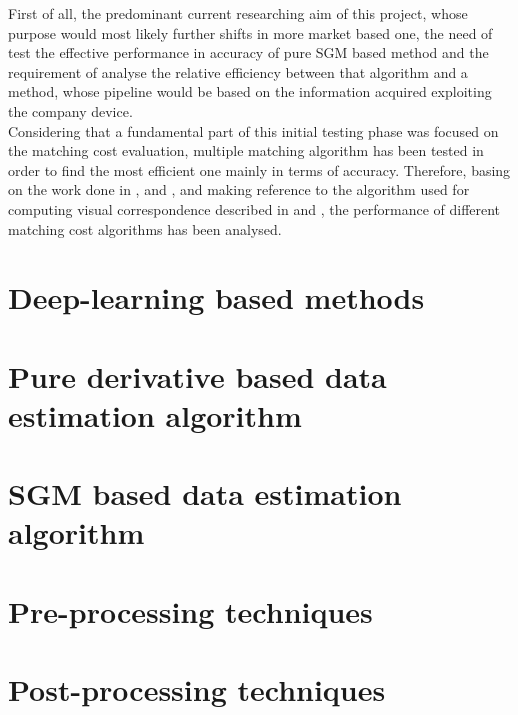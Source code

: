 First of all, the predominant current researching aim of this project, whose purpose would most likely further shifts in more market based one, the need of test the effective performance in accuracy of pure SGM based method and the requirement of analyse the relative efficiency between that algorithm and a method, whose pipeline would be based on the information acquired exploiting the company device. \\
Considering that a fundamental part of this initial testing phase was focused on the matching cost evaluation, multiple matching algorithm has been tested in order to find the most efficient one mainly in terms of accuracy. 
Therefore, basing on the work done in \cite{Hirschmuller2007}, \cite{Patil2013} and \cite{Ko2017}, and making reference to the algorithm used for computing visual correspondence described in \cite{Zabih1994} and \cite{Demetz2013}, the performance of different matching cost algorithms has been analysed. 


\section{Deep-learning based methods}
\label{section:deep-learning-method}




\section{Pure derivative based data estimation algorithm}
\label{section:deriv-based-algorithm}

\section{SGM based data estimation algorithm}
\label{section:sgm-based-algorithm}


\section{Pre-processing techniques}
\label{section:pre-process-tech}

\section{Post-processing techniques}
\label{section:post-process-tech}

